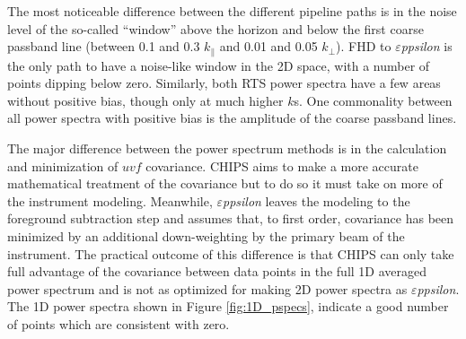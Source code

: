 \documentclass[preprint2]{aastex}
\def\eppsilon{{\it $\varepsilon$ppsilon}}
\begin{document}
The most noticeable difference between the different pipeline paths is in the noise level of the so-called ``window'' above the horizon and below the first coarse passband line (between 0.1 and 0.3 $k_\parallel$ and 0.01 and 0.05 $k_\perp$). FHD to \eppsilon{} is the only path to have a noise-like window in the 2D space, with a number of points dipping below zero. Similarly, both RTS power spectra have a few areas without positive bias, though only at much higher $k$s.  One commonality between all power spectra with positive bias is the amplitude of the coarse passband lines.


The major difference between the power spectrum methods is in the calculation and minimization of $uvf$ covariance.   CHIPS aims to make a more accurate mathematical treatment of the covariance but to do so it must take on more of the instrument modeling. Meanwhile, \eppsilon{} leaves the modeling to the foreground subtraction step and assumes that, to first order, covariance has been minimized by an  additional down-weighting by the primary beam of the instrument.  The practical outcome of this difference is that CHIPS can only take full advantage of the covariance between data points in the full 1D averaged power spectrum and is not as optimized for making 2D power spectra as \eppsilon{}.  The 1D power spectra shown in Figure \ref{fig:1D_pspecs}, indicate a good number of points which are consistent with zero.
\end{document}

